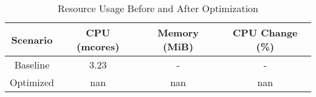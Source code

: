 
\begin{table}[h]
\centering
\caption{Resource Usage Before and After Optimization}
\begin{tabular}{|c|c|c|c|}
\hline
Scenario & CPU (mcores) & Memory (MiB) & CPU Change (\%) \\ \hline
Baseline & 3.23 & - & - \\ \hline
Optimized & nan & nan & nan \\ \hline
\end{tabular}
\end{table}
